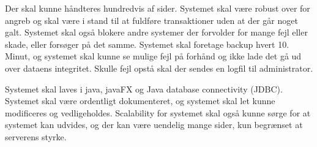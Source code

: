 Der skal kunne håndteres hundredvis af sider. Systemet skal være robust over for angreb og skal være i stand til at fuldføre transaktioner uden at der går noget galt. Systemet skal også blokere andre systemer der forvolder for mange fejl eller skade, eller forsøger på det samme. Systemet skal foretage backup hvert 10. Minut, og systemet skal kunne se mulige fejl på forhånd og ikke lade det gå ud over dataens integritet. Skulle fejl opstå skal der sendes en logfil til administrator. 
 
Systemet skal laves i java, javaFX og Java database connectivity (JDBC). Systemet skal være ordentligt dokumenteret, og systemet skal let kunne modificeres og vedligeholdes. Scalability for systemet skal også kunne sørge for at systemet kan udvides, og der kan være uendelig mange sider, kun begrænset at serverens styrke.


\FloatBarrier